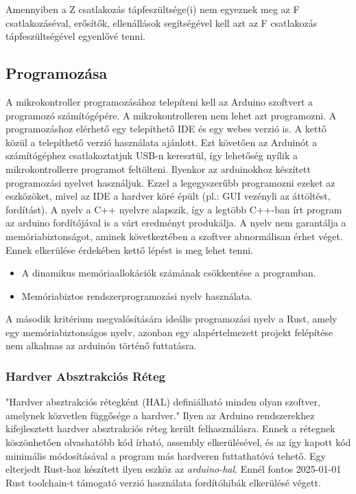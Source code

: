 Amennyiben a Z csatlakozás tápfeszültsége(i) nem egyeznek meg az F csatlakozáséval, erősítők, ellenállások segítségével kell azt az F csatlakozás tápfeszültségével egyenlővé tenni.

\subsection{Programozása}
A mikrokontroller programozásához telepíteni kell az Arduino szoftvert a programozó számítógépére.
A mikrokontrolleren nem lehet azt programozni.
A programozáshoz elérhető egy telepíthető IDE és egy webes verzió is.
A kettő közül a telepíthető verzió használata ajánlott.
Ezt követően az Arduinót a számítógéphez csatlakoztatjuk USB-n keresztül, így lehetőség nyílik a mikrokontrollerre programot feltölteni. \cite{monk2023programming}
Ilyenkor az arduinokhoz készített programozási nyelvet használjuk.
Ezzel a legegyszerűbb programozni ezeket az eszközöket, mivel az IDE a hardver köré épült (pl.: GUI vezényli az áttöltést, fordítást).
A nyelv a C++ nyelvre alapszik, így a legtöbb C++-ban írt program az arduino fordítójával is a várt eredményt produkálja.
A nyelv nem garantálja a memóriabiztonságot, aminek következtében a szoftver abnormálisan érhet véget. Ennek elkerülése érdekében kettő lépést is meg lehet tenni.
\begin{itemize}
    \item A dinamikus memóriaallokációk számának csökkentése a programban.
    \item Memóriabiztos rendszerprogramozási nyelv használata.
\end{itemize}
A második kritérium megvalósítására ideális programozási nyelv a Rust, amely egy memóriabiztonságos nyelv, azonban egy alapértelmezett projekt felépítése nem alkalmas az arduinón történő futtatásra.
\subsubsection{Hardver Absztrakciós Réteg}
"Hardver absztrakciós rétegként (HAL) definiálható minden olyan szoftver, amelynek közvetlen függősége a hardver."\cite{yoo2003introduction}
Ilyen az Arduino rendszerekhez kifejlesztett hardver absztrakciós réteg került felhasználásra.
Ennek a rétegnek köszönhetően olvashatóbb kód írható, assembly elkerülésével, és az így kapott kód minimális módosításával a program más hardveren futtathatóvá tehető.\cite{yoo2003introduction}
Egy elterjedt Rust-hoz készített ilyen eszköz az \textit{arduino-hal}.\cite{arduino_hal}
Ennél fontos 2025-01-01 Rust toolchain-t támogató verzió használata fordítóhibák elkerülésé végett.\cite{avr_compiler_bugs}

